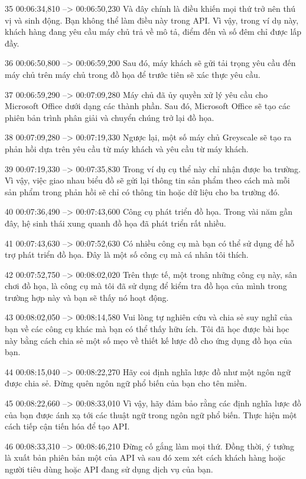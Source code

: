 35
00:06:34,810 --> 00:06:50,230
Và đây chính là điều khiến mọi thứ trở nên thú vị và sinh động.  Bạn không thể làm điều này trong API.  Vì vậy, trong ví dụ này, khách hàng đang yêu cầu máy chủ trả về mô tả, điểm đến và số đêm chỉ được lấp đầy.

36
00:06:50,800 --> 00:06:59,200
Sau đó, máy khách sẽ gửi tải trọng yêu cầu đến máy chủ trên máy chủ trong đồ họa để trước tiên sẽ xác thực yêu cầu.

37
00:06:59,290 --> 00:07:09,280
Máy chủ đã ủy quyền xử lý yêu cầu cho Microsoft Office dưới dạng các thành phần.  Sau đó, Microsoft Office sẽ tạo các phiên bản trình phân giải và chuyển chúng trở lại đồ họa.

38
00:07:09,280 --> 00:07:19,330
Ngược lại, một số máy chủ Greyscale sẽ tạo ra phản hồi dựa trên yêu cầu từ máy khách và yêu cầu từ máy khách.

39
00:07:19,330 --> 00:07:35,830
Trong ví dụ cụ thể này chỉ nhận được ba trường.  Vì vậy, việc giao nhau biểu đồ sẽ gửi lại thông tin sản phẩm theo cách mà mỗi sản phẩm trong phản hồi sẽ chỉ có thông tin hoặc dữ liệu cho ba trường đó.

40
00:07:36,490 --> 00:07:43,600
Công cụ phát triển đồ họa.  Trong vài năm gần đây, hệ sinh thái xung quanh đồ họa đã phát triển rất nhiều.

41
00:07:43,630 --> 00:07:52,630
Có nhiều công cụ mà bạn có thể sử dụng để hỗ trợ phát triển đồ họa.  Đây là một số công cụ mà cá nhân tôi thích.

42
00:07:52,750 --> 00:08:02,020
Trên thực tế, một trong những công cụ này, sân chơi đồ họa, là công cụ mà tôi đã sử dụng để kiểm tra đồ họa của mình trong trường hợp này và bạn sẽ thấy nó hoạt động.

43
00:08:02,050 --> 00:08:14,580
Vui lòng tự nghiên cứu và chia sẻ suy nghĩ của bạn về các công cụ khác mà bạn có thể thấy hữu ích.  Tôi đã học được bài học này bằng cách chia sẻ một số mẹo về thiết kế lược đồ cho ứng dụng đồ họa của bạn.

44
00:08:15,040 --> 00:08:22,270
Hãy coi định nghĩa lược đồ như một ngôn ngữ được chia sẻ.  Đừng quên ngôn ngữ phổ biến của bạn cho tên miền.

45
00:08:22,660 --> 00:08:33,010
Vì vậy, hãy đảm bảo rằng các định nghĩa lược đồ của bạn được ánh xạ tới các thuật ngữ trong ngôn ngữ phổ biến.  Thực hiện một cách tiếp cận tiến hóa để tạo API.

46
00:08:33,310 --> 00:08:46,210
Đừng cố gắng làm mọi thứ.  Đồng thời, ý tưởng là xuất bản phiên bản một của API và sau đó xem xét cách khách hàng hoặc người tiêu dùng hoặc API đang sử dụng dịch vụ của bạn.

